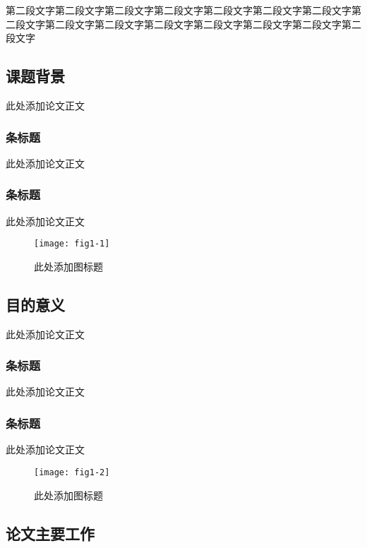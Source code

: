 \documentclass{article}
\begin{document}
第二段文字第二段文字第二段文字第二段文字第二段文字第二段文字第二段文字第二段文字第二段文字第二段文字第二段文字第二段文字第二段文字第二段文字第二段文字

\subsection{课题背景}
此处添加论文正文~\cite{kopka1995guide}

\subsubsection{条标题}
此处添加论文正文\cite{yassin1994latex}

\subsubsection{条标题}
此处添加论文正文\cite{MedvidovicC}

\begin{figure}[H]
\centering
\texttt{[image: fig1-1]}
\caption{此处添加图标题}\label{fig1-1}
\end{figure}

\subsection{目的意义}
此处添加论文正文\cite{mittelbach2004latex}

\subsubsection{条标题}
此处添加论文正文\cite{liu2013latex}

\subsubsection{条标题}
此处添加论文正文\cite{liuxiaopingwordandtex}


\begin{figure}[H]
\centering
\texttt{[image: fig1-2]}
\caption{此处添加图标题}\label{fig1-2}
\end{figure}

\subsection{论文主要工作}
\end{document}
